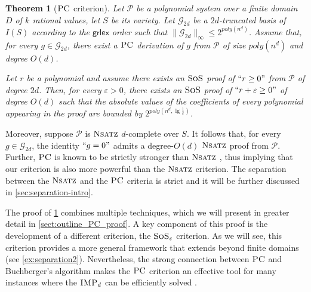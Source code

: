 \documentclass[11pt]{article}
\newcommand{\sos}{\text{\sc{SoS}}}
\newcommand{\IMP}{\textsc{IMP}}
\newcommand{\PC}{\textsc{PC}}
\newcommand{\Nsatz}{\textsc{Nsatz}}
\newcommand{\grlexns}{\textsf{grlex}}
\newcommand{\1}{\textbf{1}}
\newcommand{\GB}{\text{Gr\"{o}bner} }
\newtheorem{theorem}{Theorem}[section]
\begin{document}
\begin{theorem}[$\PC$ criterion]\label{th:PC_criterion_introduction}
    Let $\mathcal{P}$ be a polynomial system over a finite domain $D$ of $k$ rational values, let $S$ be its variety. Let $\mathcal{G}_{2d}$ be a $2d$-truncated \GB basis of $I(S)$ according to the $\grlexns$ order such that $\|\mathcal{G}_{2d}\|_{\infty}\leq 2^{poly(n^d)}$. Assume that, for every $g\in \mathcal{G}_{2d}$, there exist a $\PC$ derivation of $g$ from $\mathcal{P}$ of size $poly(n^d)$ and degree $O(d)$. 
    
    Let $r$ be a polynomial and assume there exists an $\sos$ proof of $``r \geq 0"$ from $\mathcal{P}$ of degree $2d$. Then, for every $\varepsilon>0$, there exists an $\sos$ proof of $``r + \varepsilon \geq 0"$ of degree $O(d)$
    such that the absolute values of the coefficients of every polynomial appearing in the proof are bounded by $2^{poly(n^d, \lg \frac{1}{\varepsilon})}$.
\end{theorem}

Moreover, suppose $\mathcal{P}$ is $\Nsatz$ $d$-complete over $S$. It follows that, for every $g \in \mathcal{G}_{2d}$, the identity $``g=0"$ admits a degree-$O(d)$ $\Nsatz$ proof from $\mathcal{P}$. Further, $\PC$ is known to be strictly stronger than $\Nsatz$ \cite{CleggEI96}, thus implying that our criterion is also more powerful than the $\Nsatz$ criterion.
The separation between the $\Nsatz$ and the $\PC$ criteria is strict and it will be further discussed in \cref{sec:separation-intro}.

The proof of \cref{th:PC_criterion_introduction} combines multiple techniques, which we will present in greater detail in \cref{sect:outline_PC_proof}. A key component of this proof is the development of a different criterion, the $\sos_\varepsilon$ criterion. As we will see, this criterion provides a more general framework that extends beyond finite domains (see \cref{ex:separation2}). Nevertheless, the strong connection between $\PC$ and Buchberger's algorithm makes the $\PC$ criterion an effective tool for many instances where the $\IMP_d$ can be efficiently solved \cite{Cox}.

\end{document}

